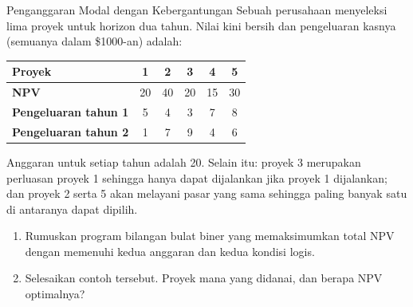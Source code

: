 \begin{ex}{Penganggaran Modal dengan Kebergantungan}{}
\label{ex:capital-dependencies}
 Sebuah perusahaan menyeleksi lima proyek untuk horizon dua tahun. Nilai kini bersih dan pengeluaran kasnya (semuanya dalam \$1000-an) adalah:

\begin{center}
\begin{tabular}{l|c|c|c|c|c}
\textbf{Proyek} & 1 & 2 & 3 & 4 & 5 \\
\hline
\textbf{NPV} & 20 & 40 & 20 & 15 & 30 \\
\textbf{Pengeluaran tahun 1} & 5 & 4 & 3 & 7 & 8 \\
\textbf{Pengeluaran tahun 2} & 1 & 7 & 9 & 4 & 6 \\
\end{tabular}
\par{}\label{tab:integerProgrammingFormulations-book1-tab05}%

\end{center}

Anggaran untuk setiap tahun adalah 20. Selain itu: proyek 3 merupakan perluasan proyek 1 sehingga hanya dapat dijalankan jika proyek 1 dijalankan; dan proyek 2 serta 5 akan melayani pasar yang sama sehingga paling banyak satu di antaranya dapat dipilih.
\begin{enumerate}
\item Rumuskan program bilangan bulat biner yang memaksimumkan total NPV dengan memenuhi kedua anggaran dan kedua kondisi logis.
\item Selesaikan contoh tersebut. Proyek mana yang didanai, dan berapa NPV optimalnya?
\end{enumerate}
\exrefs{\S\ref{sec:capital-budgeting}, \S\ref{sec:modeling-tricks}}
\end{ex}

